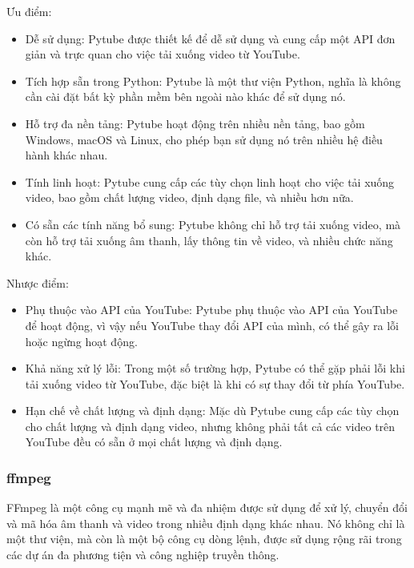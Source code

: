 \documentclass{article} %
\begin{document}
Ưu điểm:
\begin{itemize}
    \item Dễ sử dụng: Pytube được thiết kế để dễ sử dụng và cung cấp một API đơn giản và trực quan cho việc tải xuống video từ YouTube.
    \item Tích hợp sẵn trong Python: Pytube là một thư viện Python, nghĩa là không cần cài đặt bất kỳ phần mềm bên ngoài nào khác để sử dụng nó.
    \item Hỗ trợ đa nền tảng: Pytube hoạt động trên nhiều nền tảng, bao gồm Windows, macOS và Linux, cho phép bạn sử dụng nó trên nhiều hệ điều hành khác nhau.
    \item Tính linh hoạt: Pytube cung cấp các tùy chọn linh hoạt cho việc tải xuống video, bao gồm chất lượng video, định dạng file, và nhiều hơn nữa.
    \item Có sẵn các tính năng bổ sung: Pytube không chỉ hỗ trợ tải xuống video, mà còn hỗ trợ tải xuống âm thanh, lấy thông tin về video, và nhiều chức năng khác.
\end{itemize}
\hspace{0.0em} Nhược điểm:
\begin{itemize}
    \item Phụ thuộc vào API của YouTube: Pytube phụ thuộc vào API của YouTube để hoạt động, vì vậy nếu YouTube thay đổi API của mình, có thể gây ra lỗi hoặc ngừng hoạt động.
    \item Khả năng xử lý lỗi: Trong một số trường hợp, Pytube có thể gặp phải lỗi khi tải xuống video từ YouTube, đặc biệt là khi có sự thay đổi từ phía YouTube.
    \item Hạn chế về chất lượng và định dạng: Mặc dù Pytube cung cấp các tùy chọn cho chất lượng và định dạng video, nhưng không phải tất cả các video trên YouTube đều có sẵn ở mọi chất lượng và định dạng.
\end{itemize}
\subsubsection{ffmpeg}
FFmpeg là một công cụ mạnh mẽ và đa nhiệm được sử dụng để xử lý, chuyển đổi và mã hóa âm thanh và video trong nhiều định dạng khác nhau. Nó không chỉ là một thư viện, mà còn là một bộ công cụ dòng lệnh, được sử dụng rộng rãi trong các dự án đa phương tiện và công nghiệp truyền thông.
\end{document}
